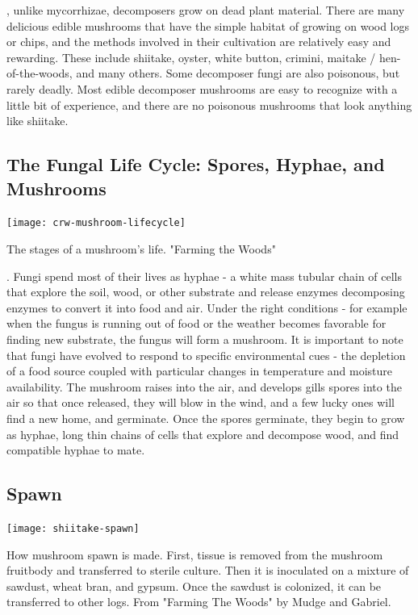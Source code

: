 \documentclass{tufte-handout}
\begin{document}
, unlike mycorrhizae, decomposers grow on dead plant material.  
There are many delicious edible mushrooms that have the simple habitat of growing on wood logs or chips, and the methods involved in their cultivation are relatively easy and rewarding. 
These include shiitake, oyster, white button, crimini, maitake / hen-of-the-woods, and many others.
Some decomposer fungi are also poisonous, but rarely deadly. 
Most edible decomposer mushrooms are easy to recognize with a little bit of experience, and there are no poisonous mushrooms that look anything like shiitake.

\subsection{The Fungal Life Cycle: Spores, Hyphae, and Mushrooms}

\begin{marginfigure}
\texttt{[image: crw-mushroom-lifecycle]}
\caption{The stages of a mushroom's life. "Farming the Woods"}
\end{marginfigure}

. 
Fungi spend most of their lives as hyphae - a white mass tubular chain of cells that explore the soil, wood, or other substrate and release enzymes decomposing enzymes to convert it into food and air. 
Under the right conditions - for example when the fungus is running out of food or the weather becomes favorable for finding new substrate, the fungus will form a mushroom.
It is important to note that fungi have evolved to respond to specific environmental cues - the depletion of a food source coupled with particular changes in temperature and moisture availability. 
The mushroom raises into the air, and develops gills spores into the air so that once released, they will blow in the wind, and a few lucky ones will find a new home, and germinate.
Once the spores germinate, they begin to grow as hyphae, long thin chains of cells that explore and decompose wood, and find compatible hyphae to mate.

\subsection{Spawn}

\begin{marginfigure}
\texttt{[image: shiitake-spawn]}
\caption{How mushroom spawn is made. First, tissue is removed from the mushroom fruitbody and transferred to  sterile culture. Then it is inoculated on a mixture of sawdust, wheat bran, and gypsum. Once the sawdust is colonized, it can be transferred to other logs. From "Farming The Woods" by Mudge and Gabriel.}
\end{marginfigure}
\end{document}
